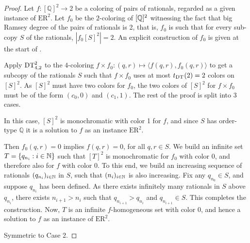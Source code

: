 \begin{proof}
  Let $f:[\mathbb Q]^2\to 2$ be a coloring of pairs of rationals, regarded as a given instance of $\mathrm{ER}^2$. Let $f_0$ be the $2$-coloring of $[\mathbb{Q}]^2$ witnessing the fact that big Ramsey degree of the pairs of rationals is 2, that is, $f_0$ is such that for every sub-copy $S$ of the rationals, $|f_0[S]^2| = 2$. An explicit construction of $f_0$ is given at the start of .

Apply $\mathrm{DT}^{2}_{4,2}$ to the $4$-coloring $f\times f_0:(q, r)\mapsto \langle f(q, r), f_0(q,r) \rangle$ to get a subcopy of the rationals $S$ such that $f \times f_0$ uses at most $t_{\mathrm{DT}^{}_{}}(2) = 2$ colors on $[S]^2$. As $[S]^2$ must have two colors for $f_0$, the two colors of $[S]^2$ for $f\times f_0$ must be of the form $(c_0, 0)$ and $(c_1,1)$. The rest of the proof is split into 3 cases.

  In this case, $[S]^2$ is monochromatic with color 1 for $f$, and since $S$ has order-type $\mathbb Q$ it is a solution to $f$ as an instance $\mathrm{ER}^2$.

  Then $f_0(q,r) = 0$ implies $f(q,r) = 0$, for all $q,r \in S$. We build an infinite set $T=\{q_{n_i}:i\in\mathbb{N}\}$ such that $[T]^2$ is monochromatic for $f_0$ with color $0$, and therefore also for $f$ with color $0$. To this end, we build an increasing sequence of rationals $(q_{n_i})_{i\in\mathbb{N}}$ in $S$, such that $(n_i)_{i\in\mathbb{N}}$ is also increasing. Fix any $q_{n_0}\in S$, and suppose $q_{n_i}$ has been defined. As there exists infinitely many rationals in $S$ above $q_{n_i}$, there exists $n_{i+1}>n_i$ such that $q_{n_{i+1}}> q_{n_i}$ and $q_{n_{i+1}}\in S$. This completes the construction. Now, $T$ is an infinite $f$-homogeneous set with color $0$, and hence a solution to $f$ as an instance of $\mathrm{ER}^2$.

  Symmetric to Case 2.
\end{proof}



